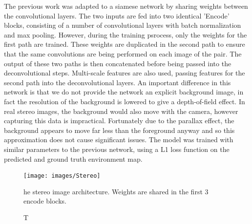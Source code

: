\documentclass[ %
                    author={Gavin Parker},
                supervisor={Dr. Neill Campbell},
                    degree={MEng},
                     title={Deep Siamese Networks for Illumination Estimation from Stereo Images},
                  subtitle={},
                      type={research},
                      year={2018} ]{dissertation}
\begin{document}
The previous work was adapted to a siamese network by sharing weights between the convolutional layers. The two inputs are fed into two identical 'Encode' blocks, consisting of a number of convolutional layers with batch normalization and max pooling. However, during the training psrocess, only the weights for the first path are trained. These weights are duplicated in the second path to ensure that the same convolutions are being performed on each image of the pair. The output of these two paths is then concatenated before being passed into the deconvolutional steps. Multi-scale features are also used, passing features for the second path into the deconvolutional layers. An important difference in this network is that we do not provide the network an explicit background image, in fact the resolution of the background is lowered to give a depth-of-field effect. In real stereo images, the background would also move with the camera, however capturing this data is impractical. Fortunately due to the parallax effect, the background appears to move far less than the foreground anyway and so this approximation does not cause significant issues. The model was trained with similar parameters to the previous network, using a L1 loss function on the predicted and ground truth environment map.
\begin{figure}
\centering
\texttt{[image: images/Stereo]}
\caption The stereo image architecture. Weights are shared in the first 3 encode blocks.
\end{figure}
\end{document}

